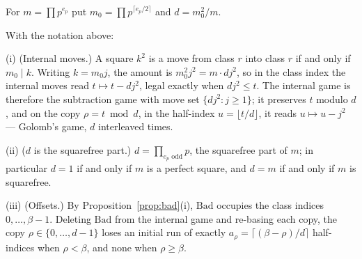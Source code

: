\begin{definition}\label{def:d}
For $m = \prod p^{e_p}$ put $m_0 = \prod p^{\lceil e_p/2 \rceil}$ and
$d = m_0^2/m$.
\end{definition}

\begin{proposition}\label{prop:internal}
With the notation above:

(i) (Internal moves.) A square $k^2$ is a move from class $r$ into class
$r$ if and only if $m_0 \mid k$. Writing $k = m_0 j$, the amount is
$m_0^2 j^2 = m \cdot d j^2$, so in the class index the internal moves
read $t \mapsto t - d j^2$, legal exactly when $d j^2 \le t$. The
internal game is therefore the subtraction game with move set
$\{d j^2 : j \ge 1\}$; it preserves $t$ modulo $d$, and on the copy
$\rho = t \bmod d$, in the half-index $u = \lfloor t/d \rfloor$, it reads
$u \mapsto u - j^2$ --- Golomb's game, $d$ interleaved times.

(ii) ($d$ is the squarefree part.) $d = \prod_{e_p \text{ odd}} p$, the
squarefree part of $m$; in particular $d = 1$ if and only if $m$ is a
perfect square, and $d = m$ if and only if $m$ is squarefree.

(iii) (Offsets.) By Proposition~\ref{prop:bad}(i), $\mathrm{Bad}$
occupies the class indices $0, \dots, \beta-1$. Deleting $\mathrm{Bad}$
from the internal game and re-basing each copy, the copy
$\rho \in \{0, \dots, d-1\}$ loses an initial run of exactly
$a_\rho = \lceil (\beta - \rho)/d \rceil$ half-indices when
$\rho < \beta$, and none when $\rho \ge \beta$.
\end{proposition}
